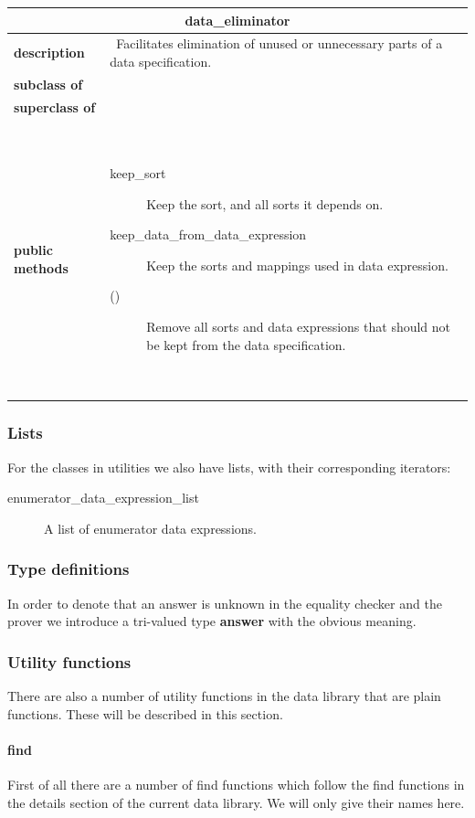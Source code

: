 \documentclass[a4paper,11pt]{article}
\newcommand{\dataclass}[5]{
\begin{flushleft}
\begin{longtable}{p{3cm} p{11cm}}
\multicolumn{2}{c}{\textbf{#1}}\\\hline\hline
\textbf{description} & ~#2~ \\\hline
\textbf{subclass of} & ~#3~ \\\hline
\textbf{superclass of} & ~#4~ \\\hline
\textbf{public methods} & ~#5~ \\\hline
\end{longtable}
\end{flushleft}
}
\begin{document}
\dataclass
  {data\_eliminator}
  {Facilitates elimination of unused or unnecessary parts of a data specification.}
  {}
  {}
  {\begin{description}
    \item[keep\_sort] Keep the sort, and all sorts it depends on.
    \item[keep\_data\_from\_data\_expression] Keep the sorts and mappings used in data expression.
    \item[()] Remove all sorts and data expressions that should not be kept from the data specification.
   \end{description}}


\subsubsection{Lists}
For the classes in utilities we also have lists, with their corresponding iterators:
\begin{description}
 \item[enumerator\_data\_expression\_list] A list of enumerator data expressions.
\end{description}

\subsubsection{Type definitions}
In order to denote that an answer is unknown in the equality checker and the prover we introduce a tri-valued type \textbf{answer} with the obvious meaning.

\subsubsection{Utility functions}
There are also a number of utility functions in the data library that are plain functions. These will be described in this section.

\paragraph{find}
First of all there are a number of find functions which follow the find functions in the details section of the current data library. We will only give their names here.
\end{document}
